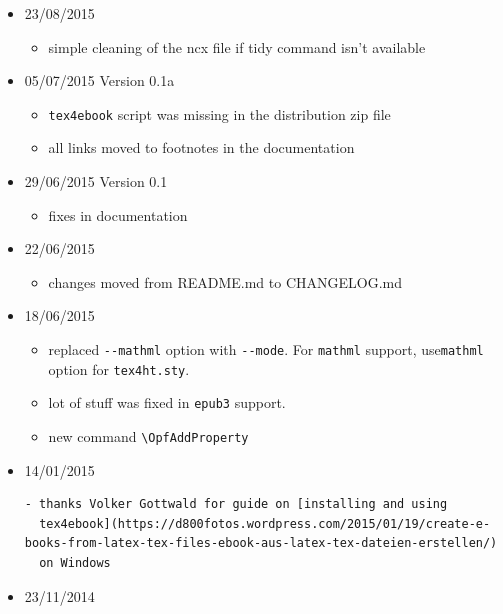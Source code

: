 \begin{itemize}
  \begin{itemize}
  \tightlist
  \item
    fatal error happened with epub3 when the document didn't contain the
    TOC
  \end{itemize}
\item
  23/08/2015

  \begin{itemize}
  \tightlist
  \item
    simple cleaning of the ncx file if tidy command isn't available
  \end{itemize}
\item
  05/07/2015 Version 0.1a

  \begin{itemize}
  \tightlist
  \item
    \texttt{tex4ebook} script was missing in the distribution zip file
  \item
    all links moved to footnotes in the documentation
  \end{itemize}
\item
  29/06/2015 Version 0.1

  \begin{itemize}
  \tightlist
  \item
    fixes in documentation
  \end{itemize}
\item
  22/06/2015

  \begin{itemize}
  \tightlist
  \item
    changes moved from README.md to CHANGELOG.md
  \end{itemize}
\item
  18/06/2015

  \begin{itemize}
  \tightlist
  \item
    replaced \texttt{-\/-mathml} option with \texttt{-\/-mode}. For
    \texttt{mathml} support, use\texttt{mathml} option for
    \texttt{tex4ht.sty}.
  \item
    lot of stuff was fixed in \texttt{epub3} support.
  \item
    new command \texttt{\textbackslash{}OpfAddProperty}
  \end{itemize}
\item
  14/01/2015

\begin{verbatim}
- thanks Volker Gottwald for guide on [installing and using
  tex4ebook](https://d800fotos.wordpress.com/2015/01/19/create-e-books-from-latex-tex-files-ebook-aus-latex-tex-dateien-erstellen/)
  on Windows
\end{verbatim}
\item
  23/11/2014


\end{itemize}
